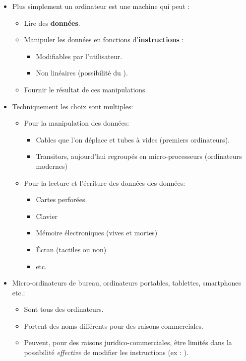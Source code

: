 \documentclass{beamer}
\begin{document}
\begin{frame}
	\begin{itemize}
		\item Plus simplement un ordinateur est une machine qui peut :
			\begin{itemize}
				\item Lire des \textbf{données}. 
				\item Manipuler les données en fonctions d'\textbf{instructions} :
					\begin{itemize}
						\item Modifiables par l'utilisateur.
						\item Non linéaires (possibilité du ).
					\end{itemize}
				\item Fournir le résultat de ces manipulations. 
			\end{itemize}
		\item Techniquement les choix sont multiples:
			\begin{itemize}
				\item Pour la manipulation des données:
					\begin{itemize}
						\item Cables que l'on déplace et tubes à vides (premiers ordinateurs).
						\item Transitors, aujourd'hui regroupés en micro-processeurs (ordinateurs modernes)
						\
					\end{itemize}
				\item Pour la lecture et l'écriture des données des données:
					\begin{itemize}
						\item Cartes perforées.
						\item Clavier
						\item Mémoire électroniques (vives et mortes)
						\item Écran (tactiles ou non)
						\item etc.
					\end{itemize}
			\end{itemize}
	\end{itemize}
\end{frame}
\begin{frame}
	\begin{itemize}
		\item Micro-ordinateurs de bureau, ordinateurs portables, tablettes, smartphones etc.:
			\begin{itemize}
				\item Sont tous des ordinateurs.
				\item Portent des noms différents pour des raisons commerciales.
				\item Peuvent, pour des raisons juridico-commerciales, être limités dans la possibilité \emph{effective} de modifier les instructions (ex : ).
			\end{itemize}
	\end{itemize}
\end{frame}
\end{document}

